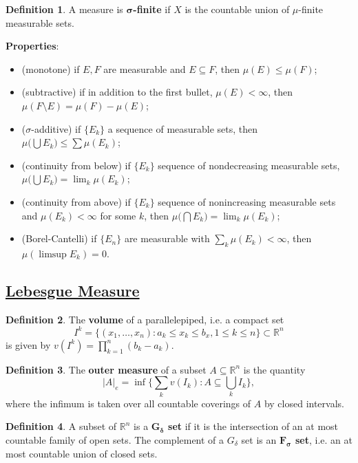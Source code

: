 \documentclass[11pt]{amsart}
\theoremstyle{definition}
\newtheorem*{definition*}{Definition}
\renewcommand\leq{\leqslant}
\renewcommand\:{\colon}
\newcommand{\R}{\mathds{R}}
\begin{document}
\begin{definition*}
	A measure is \textbf{$\boldsymbol{\sigma}$-finite} if $X$ is the countable union of $\mu$-finite measurable sets.
\end{definition*}

\noindent \textbf{Properties}:
\begin{itemize}[leftmargin=15pt]\setlength\itemsep{0em}
	\item (monotone) if $E, F$ are measurable and $E \subseteq F$, then $\mu(E) \leq \mu(F)$; 
	\item (subtractive) if in addition to the first bullet, $\mu(E) < \infty$, then $\mu(F \setminus E) = \mu(F) - \mu(E)$;
	\item ($\sigma$-additive) if $\{E_k\}$ a sequence of measurable sets, then $\mu\big( \bigcup E_k \big) \leq \sum \mu(E_k)$;
	\item (continuity from below) if $\{E_k\}$ sequence of nondecreasing measurable sets, $\mu\big( \bigcup E_k \big) = \lim_k \mu(E_k)$;
	\item (continuity from above) if $\{E_k\}$ sequence of nonincreasing measurable sets and $\mu(E_k) < \infty$ for some $k$, then $\mu\big( \bigcap E_k \big) = \lim_k \mu(E_k)$;
	\item (Borel-Cantelli) if $\{E_n\}$ are measurable with $\sum_k \mu(E_k) < \infty$, then $\mu(\limsup E_k) = 0$.
\end{itemize}
\vskip40pt 



\subsection*{\underline{Lebesgue Measure}}

\begin{definition*}
	The \textbf{volume} of a parallelepiped, i.e. a compact set
		\[ I^k = \{ (x_1, \dots, x_n) : a_k \leq x_k \leq b_x, 1 \leq k \leq n\} \subset \R^n \]
	is given by $v(I^k) = \prod_{k=1}^n (b_k - a_k)$. 
\end{definition*}

\begin{definition*}
	The \textbf{outer measure} of a subset $A \subseteq \R^n$ is the quantity
		\[ |A|_e = \inf\bigg\{ \sum_k v(I_k) : A \subseteq \bigcup_k I_k \bigg\}, \]
	where the infimum is taken over all countable coverings of $A$ by closed intervals.
\end{definition*}

\begin{definition*}
	A subset of $\R^n$ is a \textbf{$\boldsymbol{G_\delta}$ set} if it is the intersection of an at most countable family of open sets. The complement of a $G_\delta$ set is an \textbf{$\boldsymbol{F_\sigma}$ set}, i.e. an at most countable union of closed sets.
\end{definition*}
\end{document}
